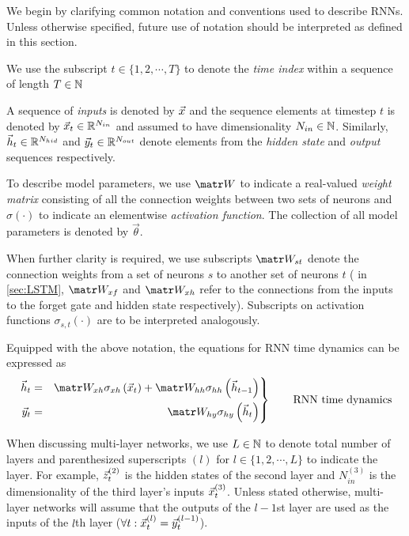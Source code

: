 We begin by clarifying common notation and conventions used to describe RNNs.
Unless otherwise specified, future use of notation should be interpreted as
defined in this section.

We use the subscript $t \in \{ 1,2,\cdots,T \}$ to denote the \emph{time index}
within a sequence of length $T \in \mathbb{N}$

A sequence of \emph{inputs} is denoted by $\vec{x}$ and the sequence elements at timestep $t$ is
denoted by $\vec{x}_t \in \mathbb{R}^{N_{in}}$ and assumed to have dimensionality $N_{in} \in \mathbb{N}$.
Similarly, $\vec{h}_t \in \mathbb{R}^{N_{hid}}$ and $\vec{y}_t \in \mathbb{R}^{N_{out}}$ denote elements
from the \emph{hidden state} and \emph{output} sequences respectively.

To describe model parameters, we use $\W$ to indicate a real-valued
\emph{weight matrix} consisting of all the connection weights between two sets
of neurons and $\sigma(\cdot)$ to indicate an elementwise \emph{activation
function}. The collection of all model parameters is denoted by $\vec{\theta}$.

When further clarity is required, we use subscripts $\W_{st}$ denote the
connection weights from a set of neurons $s$ to another set of neurons $t$ (\ie
in \vref{sec:LSTM}, $\W_{xf}$ and $\W_{xh}$ refer to the connections from the
inputs to the forget gate and hidden state respectively). Subscripts on
activation functions $\sigma_{s,t}(\cdot)$ are to be interpreted analogously.

Equipped with the above notation, the equations for RNN time dynamics can be
expressed as
\begin{equation}\label{eq:rnn-dynamics}
 \left.\begin{aligned}
          \h_t &=& \W_{xh} \sigma_{xh} \left( \x_t \right) + \W_{hh} \sigma_{hh} \left( \h_{t-1} \right)\\
          \y_t &=& \W_{hy} \sigma_{hy} \left( \h_t \right)
       \end{aligned}
 \right\}
 \qquad \text{RNN time dynamics}
\end{equation}

When discussing multi-layer networks, we use $L \in \mathbb{N}$ to denote total number
of layers and parenthesized superscripts $(l)$ for $l \in \{1,2,\cdots,L\}$ to
indicate the layer. For example, $\vec{z}^{(2)}_t$ is the hidden states of the
second layer and $N^{(3)}_{in}$ is the dimensionality of the third layer's
inputs $\vec{x}^{(3)}_t$. Unless stated otherwise, multi-layer networks will assume
that the outputs of the $l-1$st layer are used as the inputs of the $l$th layer
(\ie $\forall t: \vec{x}^{(l)}_t = \vec{y}^{(l-1)}_t$).

